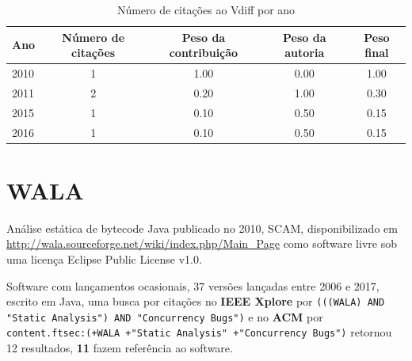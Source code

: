 \begin{table}[h]
\caption{Número de citações ao Vdiff por ano}
\centering
\begin{tabular}{| l | c | c | c | c |}
  \hline
  Ano & Número de citações & Peso da contribuição & Peso da autoria & Peso final \\
  \hline
  2010
    & 1
    & 1.00
    & 0.00
    & 1.00 \\
  2011
    & 2
    & 0.20
    & 1.00
    & 0.30 \\
  2015
    & 1
    & 0.10
    & 0.50
    & 0.15 \\
  2016
    & 1
    & 0.10
    & 0.50
    & 0.15 \\
  \hline
\end{tabular}
\end{table}


\section{WALA}

Análise estática de bytecode Java
publicado no 2010, SCAM,
disponibilizado em \url{http://wala.sourceforge.net/wiki/index.php/Main_Page}
como software livre
sob uma licença Eclipse Public License v1.0.

Software com lançamentos ocasionais,
37 versões lançadas
entre 2006 e 2017,
escrito em Java,
uma busca por citações no {\bf IEEE Xplore} por
\texttt{(((WALA) AND "Static Analysis") AND "Concurrency Bugs")}
e no {\bf ACM} por
\texttt{content.ftsec:(+WALA +"Static Analysis" +"Concurrency Bugs")}
retornou
12 resultados,
{\bf 11} fazem referência ao software.

